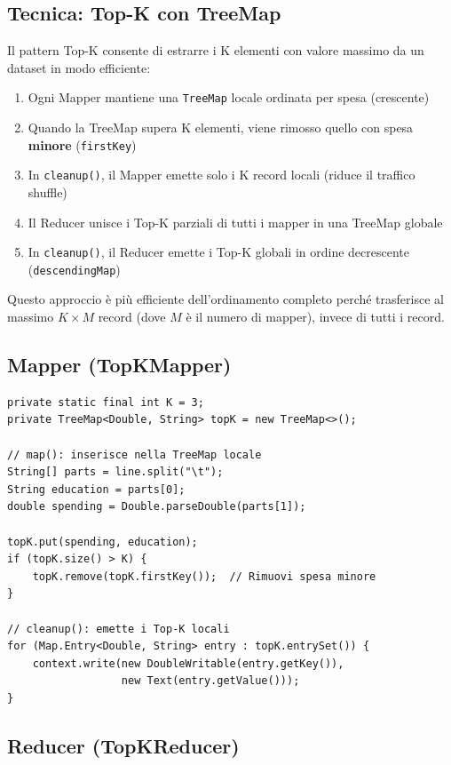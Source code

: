 \documentclass[a4paper, 12pt, oneside]{report}
\begin{document}
\subsection{Tecnica: Top-K con TreeMap}

Il pattern Top-K consente di estrarre i K elementi con valore massimo da un dataset in modo efficiente:

\begin{enumerate}
    \item Ogni Mapper mantiene una \texttt{TreeMap} locale ordinata per spesa (crescente)
    \item Quando la TreeMap supera K elementi, viene rimosso quello con spesa \textbf{minore} (\texttt{firstKey})
    \item In \texttt{cleanup()}, il Mapper emette solo i K record locali (riduce il traffico shuffle)
    \item Il Reducer unisce i Top-K parziali di tutti i mapper in una TreeMap globale
    \item In \texttt{cleanup()}, il Reducer emette i Top-K globali in ordine decrescente (\texttt{descendingMap})
\end{enumerate}

Questo approccio \`e pi\`u efficiente dell'ordinamento completo perch\'e trasferisce al massimo $K \times M$ record (dove $M$ \`e il numero di mapper), invece di tutti i record.

\subsection{Mapper (TopKMapper)}

\begin{lstlisting}[caption=Logica del TopKMapper]
private static final int K = 3;
private TreeMap<Double, String> topK = new TreeMap<>();

// map(): inserisce nella TreeMap locale
String[] parts = line.split("\t");
String education = parts[0];
double spending = Double.parseDouble(parts[1]);

topK.put(spending, education);
if (topK.size() > K) {
    topK.remove(topK.firstKey());  // Rimuovi spesa minore
}

// cleanup(): emette i Top-K locali
for (Map.Entry<Double, String> entry : topK.entrySet()) {
    context.write(new DoubleWritable(entry.getKey()),
                  new Text(entry.getValue()));
}
\end{lstlisting}

\subsection{Reducer (TopKReducer)}
\end{document}
